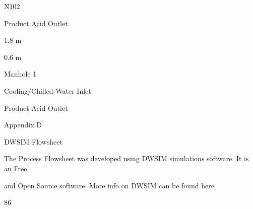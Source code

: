 \documentclass[a4paper,portrait,12pt]{article}
\begin{document}
\begin{flushleft}
N102
\end{flushleft}


\begin{flushleft}
Product Acid Outlet
\end{flushleft}





\begin{flushleft}
1.8 m
\end{flushleft}


\begin{flushleft}
0.6 m
\end{flushleft}





\begin{flushleft}
Manhole 1
\end{flushleft}





\begin{flushleft}
Cooling/Chilled Water Inlet
\end{flushleft}





\begin{flushleft}
Product Acid Outlet
\end{flushleft}





\begin{flushleft}
\newpage
Appendix D
\end{flushleft}





\begin{flushleft}
DWSIM Flowsheet
\end{flushleft}


\begin{flushleft}
The Process Flowsheet was developed using DWSIM simulations software. It is an Free
\end{flushleft}


\begin{flushleft}
and Open Source software. More info on DWSIM can be found here
\end{flushleft}





86
\end{document}
